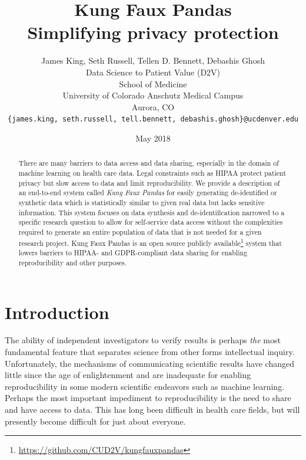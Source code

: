 \documentclass{article}
\title{%
  Kung Faux Pandas \\
  \large Simplifying privacy protection
  }
\author{
  James King, Seth Russell, Tellen D. Bennett, Debashis Ghosh\\
  Data Science to Patient Value (D2V)\\
  School of Medicine\\
  University of Colorado Anschutz Medical Campus\\
  Aurora, CO\\
  \texttt{\{james.king, seth.russell, tell.bennett, debashis.ghosh\}@ucdenver.edu}
  }
\date{May 2018}
\begin{document}

\maketitle

\begin{abstract}
There are many barriers to data access and data sharing, especially in the domain of machine learning on health care data. Legal constraints such as HIPAA protect patient privacy but slow access to data and limit reproducibility. We provide a description of an end-to-end system called \emph{Kung Faux Pandas} for easily generating de-identified or synthetic data which is statistically similar to given real data but lacks sensitive information. This system focuses on data synthesis and de-identification narrowed to a specific research question to allow for self-service data access without the complexities required to generate an entire population of data that is not needed for a given research project. Kung Faux Pandas is an open source publicly available\footnote{\url{https://github.com/CUD2V/kungfauxpandas}} system that lowers barriers to HIPAA- and GDPR-compliant data sharing for enabling reproducibility and other purposes.
\end{abstract}

\section{Introduction}

The ability of independent investigators to verify results is perhaps \emph{the} most fundamental feature that separates science from other forms intellectual inquiry. Unfortunately, the mechanisms of communicating scientific results have changed little since the age of enlightenment and are inadequate for enabling reproducibility in some modern scientific endeavors such as machine learning. Perhaps the most important impediment to reproducibility is the need to share and have access to data. This has long been difficult in health care fields, but will presently become difficult for just about everyone.
\end{document}
